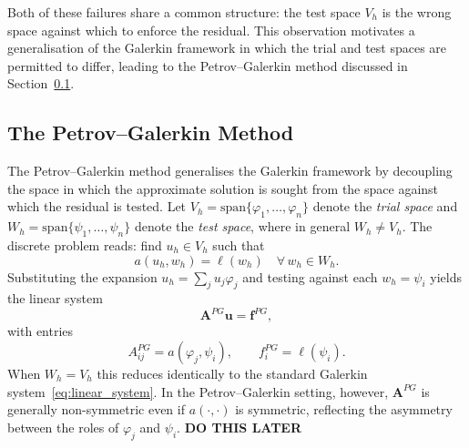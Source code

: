 \documentclass[12pt]{article}
\theoremstyle{definition}
\theoremstyle{remark}
\begin{document}
Both of these failures share a common structure: the test space $V_h$ is the
wrong space against which to enforce the residual. This observation motivates a
generalisation of the Galerkin framework in which the trial and test spaces are
permitted to differ, leading to the Petrov--Galerkin method discussed in
Section~\ref{sec:petrov-galerkin}.

\subsection{The Petrov--Galerkin Method}\label{sec:petrov-galerkin}

The Petrov--Galerkin method generalises the Galerkin framework by decoupling
the space in which the approximate solution is sought from the space against
which the residual is tested. Let $V_h = \mathrm{span}\{\varphi_1, \ldots,
\varphi_n\}$ denote the \emph{trial space} and $W_h = \mathrm{span}\{\psi_1,
\ldots, \psi_n\}$ denote the \emph{test space}, where in general $W_h \neq
V_h$. The discrete problem reads: find $u_h \in V_h$ such that
\begin{equation}
    a(u_h, w_h) = \ell(w_h) \quad \forall\, w_h \in W_h.
    \label{eq:pg_weak}
\end{equation}
Substituting the expansion $u_h = \sum_j u_j \varphi_j$ and testing against
each $w_h = \psi_i$ yields the linear system
\begin{equation}
    \mathbf{A}^{PG} \mathbf{u} = \mathbf{f}^{PG},
    \label{eq:pg_system}
\end{equation}
with entries
\begin{equation}
    A^{PG}_{ij} = a(\varphi_j, \psi_i), \qquad f^{PG}_i = \ell(\psi_i).
\end{equation}
When $W_h = V_h$ this reduces identically to the standard Galerkin
system~\eqref{eq:linear_system}. In the Petrov--Galerkin setting, however,
$\mathbf{A}^{PG}$ is generally non-symmetric even if $a(\cdot,\cdot)$ is
symmetric, reflecting the asymmetry between the roles of $\varphi_j$ and
$\psi_i$. \textbf{DO THIS LATER}
\end{document}
